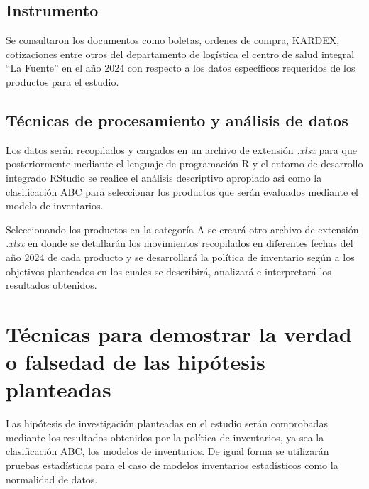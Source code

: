 \subsection{Instrumento}
Se consultaron los documentos como boletas, ordenes de compra, KARDEX, cotizaciones entre otros del departamento de logística el centro de salud integral ``La Fuente'' en el año 2024 con respecto a los datos específicos requeridos de los productos para el estudio.

\subsection{Técnicas de procesamiento y análisis de datos}
Los datos serán recopilados y cargados en un archivo de extensión \textsl{.xlsx} para que posteriormente mediante el lenguaje de programación R y el entorno de desarrollo integrado RStudio se realice el análisis descriptivo apropiado asi como la clasificación ABC para seleccionar los productos que serán evaluados mediante el modelo de inventarios.

Seleccionando los productos en la categoría A se creará otro archivo de extensión \textsl{.xlsx} en donde se detallarán los movimientos recopilados en diferentes fechas del año 2024 de cada producto y se desarrollará la política de inventario según a los objetivos planteados en los cuales se describirá, analizará e interpretará los resultados obtenidos.

\section{Técnicas para demostrar la verdad o falsedad de las hipótesis planteadas}

Las hipótesis de investigación planteadas en el estudio serán comprobadas mediante los resultados obtenidos por la política de inventarios, ya sea la clasificación ABC, los modelos de inventarios. De igual forma se utilizarán pruebas estadísticas para el caso de modelos inventarios estadísticos como la normalidad de datos.
